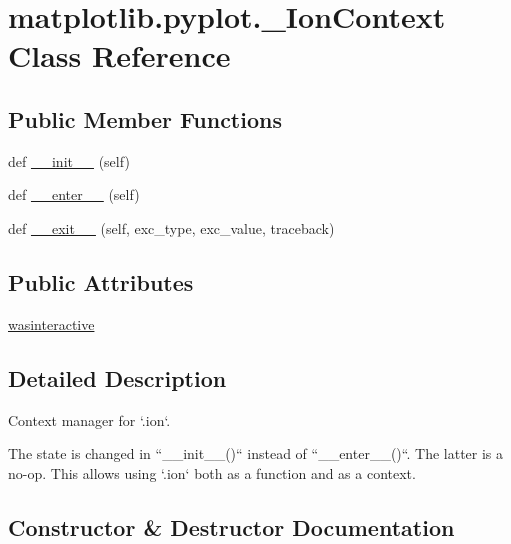 \hypertarget{classmatplotlib_1_1pyplot_1_1__IonContext}{}\section{matplotlib.\+pyplot.\+\_\+\+Ion\+Context Class Reference}
\label{classmatplotlib_1_1pyplot_1_1__IonContext}
\subsection*{Public Member Functions}
\begin{DoxyCompactItemize}
\item 
def \hyperlink{classmatplotlib_1_1pyplot_1_1__IonContext_a9a5f678af4b48267dc3f47a9102cafa4}{\+\_\+\+\_\+init\+\_\+\+\_\+} (self)
\item 
def \hyperlink{classmatplotlib_1_1pyplot_1_1__IonContext_ab6ac537bac4ccc4f778db0546a4f0f8b}{\+\_\+\+\_\+enter\+\_\+\+\_\+} (self)
\item 
def \hyperlink{classmatplotlib_1_1pyplot_1_1__IonContext_adf6551ae42b07c5725f0aa031e089222}{\+\_\+\+\_\+exit\+\_\+\+\_\+} (self, exc\+\_\+type, exc\+\_\+value, traceback)
\end{DoxyCompactItemize}
\subsection*{Public Attributes}
\begin{DoxyCompactItemize}
\item 
\hyperlink{classmatplotlib_1_1pyplot_1_1__IonContext_a2ad21ce6bd182b495ee91029e603617e}{wasinteractive}
\end{DoxyCompactItemize}


\subsection{Detailed Description}
\begin{DoxyVerb}Context manager for `.ion`.

The state is changed in ``__init__()`` instead of ``__enter__()``. The
latter is a no-op. This allows using `.ion` both as a function and
as a context.
\end{DoxyVerb}
 

\subsection{Constructor \& Destructor Documentation}
\mbox{\label{classmatplotlib_1_1pyplot_1_1__IonContext_a9a5f678af4b48267dc3f47a9102cafa4}} 
